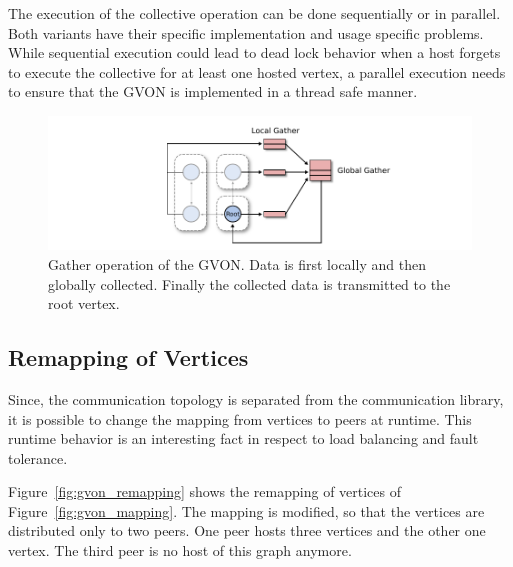 The execution of the collective operation can be done sequentially or in
parallel. Both variants have their specific implementation and usage
specific problems. While sequential execution could lead to dead lock behavior
when a host forgets to execute the collective for at least one hosted vertex,
a parallel execution needs to ensure that the GVON is implemented in
a thread safe manner.

\begin{figure}[H]
  \centering \includegraphics[width=\textwidth]{graphics/30_gvon_collective}
  \caption{Gather operation of the GVON. Data is first locally 
    and then globally collected. Finally the collected data
    is transmitted to the root vertex.}
  \label{fig:gvon_collective}
\end{figure}


\subsection{Remapping of Vertices}
\label{sec:remapping}
Since, the communication topology is separated from the communication
library, it is possible to change the mapping from vertices to peers
at runtime. This runtime behavior is an interesting fact in respect to
load balancing and fault tolerance.


Figure~\ref{fig:gvon_remapping} shows the remapping of
vertices of Figure~\ref{fig:gvon_mapping}. The mapping is modified, so that the
vertices are distributed only to two peers. One peer hosts three
vertices and the other one vertex. The third peer is no host of this
graph anymore.

